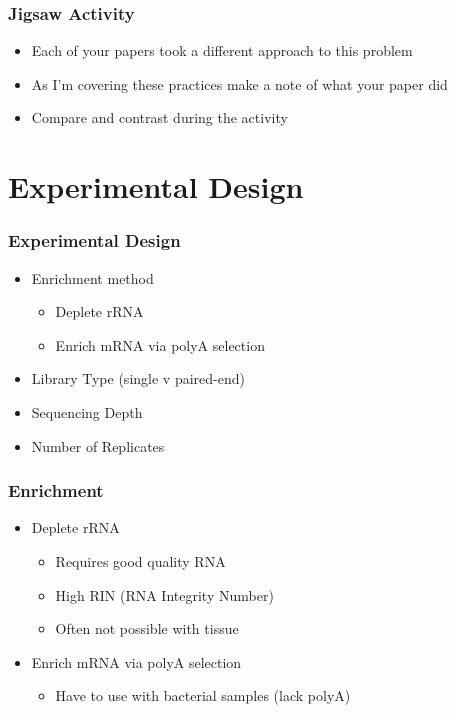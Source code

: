 \documentclass[14pt]{beamer}
\begin{document}
\begin{frame}
\frametitle{Jigsaw Activity}
\begin{itemize}
	\item<+-> Each of your papers took a different approach to this problem
	\item<+-> As I'm covering these practices make a note of what your paper did
	\item<+-> Compare and contrast during the activity
\end{itemize}
\end{frame}

\section{Experimental Design}
\begin{frame}
\frametitle{Experimental Design}
\begin{itemize}
	\item<+-> Enrichment method
	\begin{itemize}
		\item<+-> Deplete rRNA 
		\item<+-> Enrich mRNA via polyA selection
	\end{itemize}
	\item<+-> Library Type (single v paired-end)
	\item<+-> Sequencing Depth
	\item<+-> Number of Replicates
\end{itemize}
\end{frame}

\begin{frame}
\frametitle{Enrichment}
\begin{itemize}
	\item<1-> Deplete rRNA
	\begin{itemize}
		\item<3-> Requires good quality RNA
		\item<4-> High RIN (RNA Integrity Number)
		\item<5-> Often not possible with tissue
	\end{itemize}
	\item<2-> Enrich mRNA via polyA selection
	\begin{itemize}
		\item<6-> Have to use with bacterial samples (lack polyA)
	\end{itemize}	
\end{itemize}
\end{frame}
\end{document}
